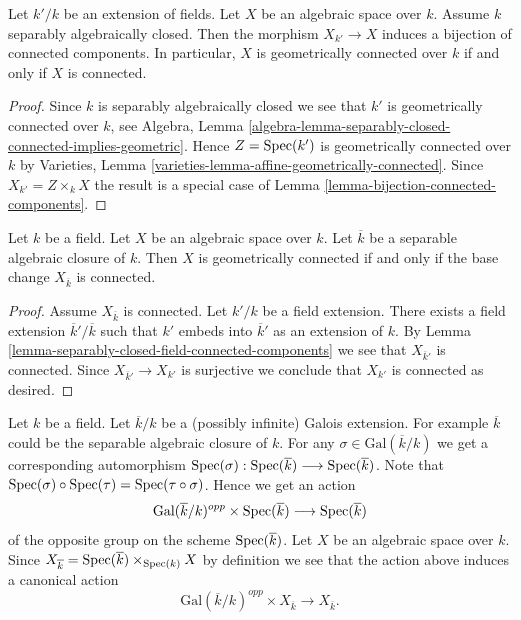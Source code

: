\begin{lemma}
\label{lemma-separably-closed-field-connected-components}
Let $k'/k$ be an extension of fields. Let $X$ be an algebraic space
over $k$. Assume $k$ separably algebraically closed. Then the morphism
$X_{k'} \to X$ induces a bijection of connected components. In particular,
$X$ is geometrically connected over $k$ if and only if $X$ is connected.
\end{lemma}

\begin{proof}
Since $k$ is separably algebraically closed we see that
$k'$ is geometrically connected over $k$, see
Algebra,
Lemma \ref{algebra-lemma-separably-closed-connected-implies-geometric}.
Hence $Z = \mathop{\mathrm{Spec}}(k')$ is geometrically connected over $k$ by
Varieties, Lemma \ref{varieties-lemma-affine-geometrically-connected}.
Since $X_{k'} = Z \times_k X$ the result is a special case of
Lemma \ref{lemma-bijection-connected-components}.
\end{proof}

\begin{lemma}
\label{lemma-characterize-geometrically-connected}
Let $k$ be a field. Let $X$ be an algebraic space over $k$.
Let $\overline{k}$ be a separable algebraic closure of $k$.
Then $X$ is geometrically connected if and only if the base change
$X_{\overline{k}}$ is connected.
\end{lemma}

\begin{proof}
Assume $X_{\overline{k}}$ is connected. Let $k'/k$ be a field
extension. There exists a field extension $\overline{k}'/\overline{k}$
such that $k'$ embeds into $\overline{k}'$ as an extension of $k$.
By Lemma \ref{lemma-separably-closed-field-connected-components}
we see that $X_{\overline{k}'}$ is connected.
Since $X_{\overline{k}'} \to X_{k'}$ is surjective we conclude
that $X_{k'}$ is connected as desired.
\end{proof}

\noindent
Let $k$ be a field. Let $\overline{k}/k$ be a (possibly infinite)
Galois extension. For example $\overline{k}$ could be the
separable algebraic closure of $k$.
For any $\sigma \in \text{Gal}(\overline{k}/k)$ we get a corresponding
automorphism
$
\mathop{\mathrm{Spec}}(\sigma) :
\mathop{\mathrm{Spec}}(\overline{k})
\longrightarrow
\mathop{\mathrm{Spec}}(\overline{k})
$.
Note that
$\mathop{\mathrm{Spec}}(\sigma) \circ \mathop{\mathrm{Spec}}(\tau) = \mathop{\mathrm{Spec}}(\tau \circ \sigma)$.
Hence we get an action
$$
\text{Gal}(\overline{k}/k)^{opp} \times \mathop{\mathrm{Spec}}(\overline{k})
\longrightarrow
\mathop{\mathrm{Spec}}(\overline{k})
$$
of the opposite group on the scheme $\mathop{\mathrm{Spec}}(\overline{k})$.
Let $X$ be an algebraic space over $k$. Since
$X_{\overline{k}} =
\mathop{\mathrm{Spec}}(\overline{k}) \times_{\mathop{\mathrm{Spec}}(k)} X$
by definition we see that the action above induces a canonical action
\begin{equation}
\label{equation-galois-action-base-change-kbar}
\text{Gal}(\overline{k}/k)^{opp} \times X_{\overline{k}}
\longrightarrow
X_{\overline{k}}.
\end{equation}

